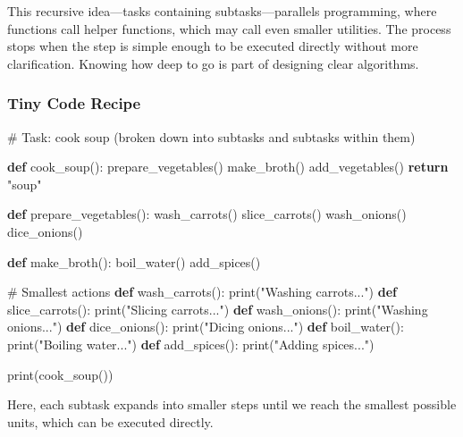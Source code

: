 \documentclass[
  letterpaper,
  DIV=11,
  numbers=noendperiod]{scrreprt}
\newenvironment{Shaded}{\begin{snugshade}}{\end{snugshade}}
\newcommand{\BuiltInTok}[1]{\textcolor[rgb]{0.00,0.23,0.31}{#1}}
\newcommand{\CommentTok}[1]{\textcolor[rgb]{0.37,0.37,0.37}{#1}}
\newcommand{\ControlFlowTok}[1]{\textcolor[rgb]{0.00,0.23,0.31}{\textbf{#1}}}
\newcommand{\KeywordTok}[1]{\textcolor[rgb]{0.00,0.23,0.31}{\textbf{#1}}}
\newcommand{\NormalTok}[1]{\textcolor[rgb]{0.00,0.23,0.31}{#1}}
\newcommand{\StringTok}[1]{\textcolor[rgb]{0.13,0.47,0.30}{#1}}
\begin{document}
This recursive idea---tasks containing subtasks---parallels programming,
where functions call helper functions, which may call even smaller
utilities. The process stops when the step is simple enough to be
executed directly without more clarification. Knowing how deep to go is
part of designing clear algorithms.

\subsubsection{Tiny Code Recipe}\label{tiny-code-recipe-30}

\begin{Shaded}
\begin{Highlighting}[]
\CommentTok{\# Task: cook soup (broken down into subtasks and subtasks within them)}

\KeywordTok{def}\NormalTok{ cook\_soup():}
\NormalTok{    prepare\_vegetables()}
\NormalTok{    make\_broth()}
\NormalTok{    add\_vegetables()}
    \ControlFlowTok{return} \StringTok{"soup"}

\KeywordTok{def}\NormalTok{ prepare\_vegetables():}
\NormalTok{    wash\_carrots()}
\NormalTok{    slice\_carrots()}
\NormalTok{    wash\_onions()}
\NormalTok{    dice\_onions()}

\KeywordTok{def}\NormalTok{ make\_broth():}
\NormalTok{    boil\_water()}
\NormalTok{    add\_spices()}

\CommentTok{\# Smallest actions}
\KeywordTok{def}\NormalTok{ wash\_carrots(): }\BuiltInTok{print}\NormalTok{(}\StringTok{"Washing carrots..."}\NormalTok{)}
\KeywordTok{def}\NormalTok{ slice\_carrots(): }\BuiltInTok{print}\NormalTok{(}\StringTok{"Slicing carrots..."}\NormalTok{)}
\KeywordTok{def}\NormalTok{ wash\_onions(): }\BuiltInTok{print}\NormalTok{(}\StringTok{"Washing onions..."}\NormalTok{)}
\KeywordTok{def}\NormalTok{ dice\_onions(): }\BuiltInTok{print}\NormalTok{(}\StringTok{"Dicing onions..."}\NormalTok{)}
\KeywordTok{def}\NormalTok{ boil\_water(): }\BuiltInTok{print}\NormalTok{(}\StringTok{"Boiling water..."}\NormalTok{)}
\KeywordTok{def}\NormalTok{ add\_spices(): }\BuiltInTok{print}\NormalTok{(}\StringTok{"Adding spices..."}\NormalTok{)}

\BuiltInTok{print}\NormalTok{(cook\_soup())}
\end{Highlighting}
\end{Shaded}

Here, each subtask expands into smaller steps until we reach the
smallest possible units, which can be executed directly.
\end{document}
